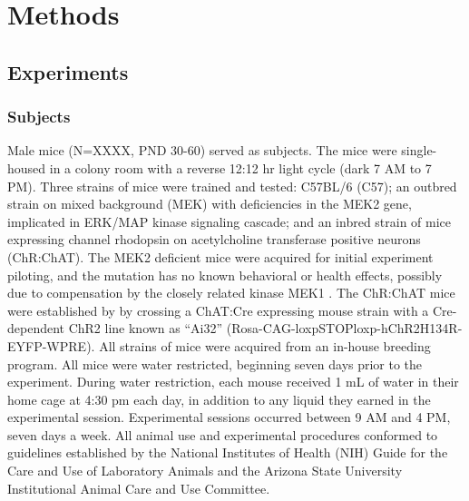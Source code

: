 \section*{Methods}
\label{sec:methods}
\subsection*{Experiments}

\subsubsection*{Subjects}
\label{sec:methods_subjects}
Male mice (N=XXXX, PND 30-60) served as subjects. The mice were single-housed in a colony room with a reverse 12:12 hr light cycle (dark 7 AM to 7 PM). Three strains of mice were trained and tested: C57BL/6 (C57); an outbred strain on mixed background (MEK) with deficiencies in the MEK2 gene, implicated in ERK/MAP kinase signaling cascade; and an inbred strain of mice expressing channel rhodopsin on acetylcholine transferase positive neurons (ChR:ChAT). The MEK2 deficient mice were acquired for initial experiment piloting, and the mutation has no known behavioral or health effects, possibly due to compensation by the closely related kinase MEK1 \cite{12832465}. The ChR:ChAT mice were established by by crossing a ChAT:Cre expressing mouse strain with a Cre-dependent ChR2 line known as “Ai32” (Rosa-CAG-loxpSTOPloxp-hChR2H134R-EYFP-WPRE). All strains of mice were acquired from an in-house breeding program. All mice were water restricted, beginning seven days prior to the experiment. During water restriction, each mouse received 1 mL of water in their home cage at 4:30 pm each day, in addition to any liquid they earned in the experimental session. Experimental sessions occurred between 9 AM and 4 PM, seven days a week. All animal use and experimental procedures conformed to guidelines established by the National Institutes of Health (NIH) Guide for the Care and Use of Laboratory Animals and the Arizona State University Institutional Animal Care and Use Committee.
  